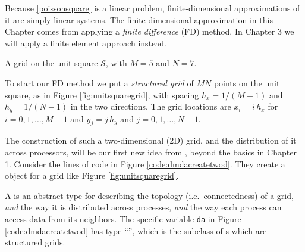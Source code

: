 Because \eqref{poissonsquare} is a linear problem, finite-dimensional approximations of it are simply linear systems.  The finite-dimensional approximation in this Chapter comes from applying a \emph{finite difference} (FD) method.  In Chapter 3 we will apply a finite element approach instead.

\begin{marginfigure}
\caption{A grid on the unit square $\mathcal{S}$, with $M=5$ and $N=7$.}
\label{fig:unitsquaregrid}
\end{marginfigure}

To start our FD method we put a \emph{structured grid} of $MN$ points on the unit square, as in Figure \ref{fig:unitsquaregrid}, with spacing $h_x=1/(M-1)$ and $h_y=1/(N-1)$ in the two directions.  The grid locations are $x_i = i\, h_x$ for $i = 0,1,\dots,M-1$ and $y_j = j\, h_y$ and $j=0,1,\dots,N-1$.

The construction of such a two-dimensional (2D) grid, and the distribution of it across processors, will be our first new idea from \PETSc, beyond the basics in Chapter 1.  Consider the lines of code in Figure \ref{code:dmdacreatetwod}.  They create a \PETSc \pDM object for a grid like Figure \ref{fig:unitsquaregrid}.

\clearpage
{}

A \pDM is an abstract type for describing the topology (i.e.~connectedness) of a grid, \emph{and} the way it is distributed across \MPI processes, \emph{and} the way each process can access data from its neighbors.  The specific variable \texttt{da} in Figure \ref{code:dmdacreatetwod} has type ``\pDMDA'', which is the subclass of \pDM s which are structured grids.

